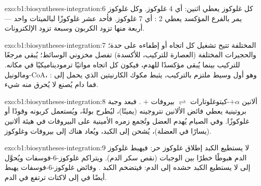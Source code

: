\begin{solution}{exo:b1:biosyntheses-integration:6}
كل غلوكوز يعطي  اثنين: أي 4 غلوكوز. وكل غلوكوز يمر بالفرع
المؤكسد يعطي 2 : أي 7 غلوكوز. فأحد عشر غلوكوزًا لبالميتات واحد
--- أربعة منها تزود الكربون وسبعة تزود الإلكترونات.
\end{solution}

\begin{solution}{exo:b1:biosyntheses-integration:7}
 المختلفة تتيح تشغيل كل اتجاه أو إطفاءه على حدة؛ والحجيرات
المختلفة (العصارة للتركيب،  للأكسدة) تفصل مخزوني الوسائط؛
 يُبقى مرجعًا للتركيب بينما يُبقى  مؤكسدًا للهدم، فيكون كل
اتجاه مواتيًا ترموديناميكيًا في مكانه. ومالونيل-CoA، وهو أول وسيط
ملتزم بالتركيب، يثبط مكوك الكارنيتين الذي يحمل  إلى
: فما دام  يُصنع لا يُحرق منه شيء.
\end{solution}

\begin{solution}{exo:b1:biosyntheses-integration:8}
ألانين $+ \alpha$-كيتوغلوتارات $\rightleftharpoons$ بيروفات $+$
. فبعد وجبة بروتينية يعطي فائض الألانين نتروجينه 
(يمينًا)، ليُطرح بولةً، ويُستعمل كربونه وقودًا أو غلوكوزًا. وفي
الصيام يُهدم  العضل وتُجمع زمره الأمينية على البيروفات في هيئة
ألانين (يسارًا في العضلة)، يُشحن إلى الكبد، ويُعاد هناك إلى بيروفات
وغلوكوز.
\end{solution}

\begin{solution}{exo:b1:biosyntheses-integration:9}
لا يستطيع الكبد إطلاق غلوكوز حر: فيهبط غلوكوز الدم هبوطًا خطرًا بين
الوجبات (نقص سكر الدم). ويتراكم غلوكوز-6-فوسفات ويُحوَّل إلى
 لا يستطيع الكبد حشده إلى الدم: فيتضخم الكبد .
وفائض غلوكوز-6-فوسفات يهبط أيضًا في  إلى لاكتات ترتفع
في الدم.
\end{solution}

